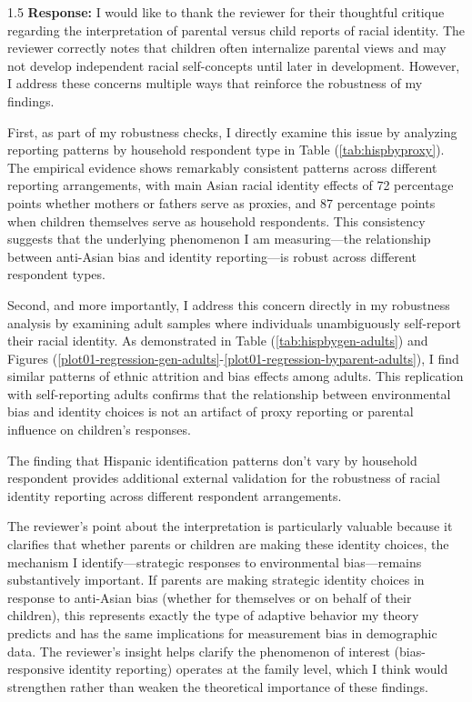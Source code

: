 \documentclass[12pt,english]{article}
\newcommand{\rrxspc}{1.5}
\begin{document}
\begin{refsection}
        \begin{spacing}{\rrxspc}
           \textbf{Response:} I would like to thank the reviewer for their thoughtful critique regarding the interpretation of parental versus child reports of racial identity. The reviewer correctly notes that children often internalize parental views and may not develop independent racial self-concepts until later in development. However, I address these concerns multiple ways that reinforce the robustness of my findings.
           
           First, as part of my robustness checks, I directly examine this issue by analyzing reporting patterns by household respondent type in Table (\ref{tab:hispbyproxy}). The empirical evidence shows remarkably consistent patterns across different reporting arrangements, with main Asian racial identity effects of 72 percentage points whether mothers or fathers serve as proxies, and 87 percentage points when children themselves serve as household respondents. This consistency suggests that the underlying phenomenon I am measuring—the relationship between anti-Asian bias and identity reporting—is robust across different respondent types.
           
           Second, and more importantly, I address this concern directly in my robustness analysis by examining adult samples where individuals unambiguously self-report their racial identity. As demonstrated in Table (\ref{tab:hispbygen-adults}) and Figures (\ref{plot01-regression-gen-adults}-\ref{plot01-regression-byparent-adults}), I find similar patterns of ethnic attrition and bias effects among adults. This replication with self-reporting adults confirms that the relationship between environmental bias and identity choices is not an artifact of proxy reporting or parental influence on children's responses.
                      
           The \textcite{duncanIntermarriageIntergenerationalTransmission2011} finding that Hispanic identification patterns don't vary by household respondent provides additional external validation for the robustness of racial identity reporting across different respondent arrangements.
           
           The reviewer's point about the interpretation is particularly valuable because it clarifies that whether parents or children are making these identity choices, the mechanism I identify---strategic responses to environmental bias---remains substantively important. If parents are making strategic identity choices in response to anti-Asian bias (whether for themselves or on behalf of their children), this represents exactly the type of adaptive behavior my theory predicts and has the same implications for measurement bias in demographic data. The reviewer's insight helps clarify the phenomenon of interest (bias-responsive identity reporting) operates at the family level, which I think would strengthen rather than weaken the theoretical importance of these findings.


\end{spacing}
\end{refsection}
\end{document}
